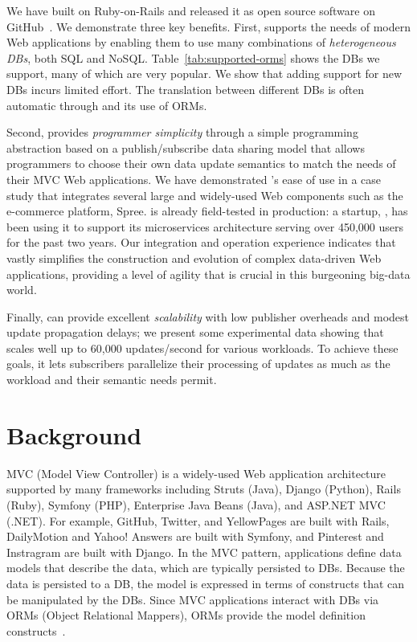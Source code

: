 We have built \synapse on Ruby-on-Rails and released it as open source software
 on GitHub~\cite{synapse-sources}. We demonstrate three
key benefits.  First, \synapse supports the needs of modern Web
applications by enabling them to use many combinations of
\emph{heterogeneous DBs}, both SQL and NoSQL. Table~\ref{tab:supported-orms}
shows the DBs we support, many of which are very popular.
We show that adding support for new DBs incurs limited effort.  The translation
between different DBs is often automatic through \synapse and its use of ORMs.

Second, \synapse provides
\emph{programmer simplicity} through a simple programming abstraction
based on a publish/subscribe data sharing model that allows programmers to choose their own data update semantics to match the needs of their MVC Web applications.
We have demonstrated \synapse's ease of use in a case study that integrates several large and widely-used Web components such as
the e-commerce platform, Spree.
\synapse is already field-tested in production: a startup, \crowdtap, has been using it to support its microservices architecture serving over 450,000 users for the past two years.
Our integration and operation experience indicates that \synapse vastly
simplifies the construction and evolution of complex data-driven Web
applications, providing a level of agility that is crucial in this
burgeoning big-data world.

Finally, \synapse can provide excellent \emph{scalability} with low publisher
overheads and modest update propagation delays; we present some experimental
data showing that \synapse scales well up to 60,000 updates/second for various
workloads.  To achieve these goals, it lets subscribers parallelize their
processing of updates as much as the workload and their semantic needs
permit.

\section{Background}
\label{s:motivation}

MVC (Model View Controller) is a widely-used Web application architecture supported by many frameworks including Struts (Java), Django (Python), Rails (Ruby),
Symfony (PHP), Enterprise Java Beans (Java), and ASP.NET MVC (.NET).
For example, GitHub, Twitter, and YellowPages are built with Rails,
DailyMotion and Yahoo! Answers are built with Symfony, and Pinterest
and Instragram are built with Django.
In the MVC pattern, applications define data models that describe the 
data, which are typically
persisted to DBs.  Because the data is persisted to a DB, the 
model is expressed in terms of constructs that can be manipulated by
the DBs.  Since MVC applications interact with DBs via ORMs (Object Relational Mappers), ORMs
provide the model definition constructs~\cite{Barcia:2008aa}.

